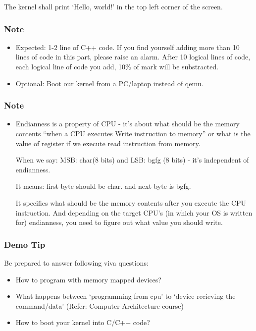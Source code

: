 \documentclass[]{book}
\begin{document}
The kernel shall print `Hello, world!' in the top left corner of the
screen.

\subsubsection*{Note}\label{note}

\begin{itemize}
\itemsep1pt\parskip0pt
\item
  Expected: 1-2 line of C++ code. If you find yourself adding more than
  10 lines of code in this part, please raise an alarm. After 10 logical
  lines of code, each logical line of code you add, 10\% of mark will be
  substracted.
\item
  Optional: Boot our kernel from a PC/laptop instead of qemu.
\end{itemize}

\subsubsection*{Note}\label{note-1}

\begin{itemize}
\item
  Endianness is a property of CPU - it's about what should be the memory
  contents ``when a CPU executes Write instruction to memory'' or what
  is the value of register if we execute read instruction from memory.

  When we say: MSB: char(8 bits) and LSB: bgfg (8 bits) - it's
  independent of endianness.

  It means: first byte should be char. and next byte is bgfg.

  It specifies what should be the memory contents after you execute the
  CPU instruction. And depending on the target CPU's (in which your OS
  is written for) endianness, you need to figure out what value you
  should write.
\end{itemize}

\subsubsection*{Demo Tip}\label{demo-tip}

Be prepared to answer following viva questions:

\begin{itemize}
\itemsep1pt\parskip0pt
\item
  How to program with memory mapped devices?
\item
  What happens between `programming from cpu' to `device recieving the
  command/data' (Refer: Computer Architecture course)
\item
  How to boot your kernel into C/C++ code?
\end{itemize}
\end{document}
